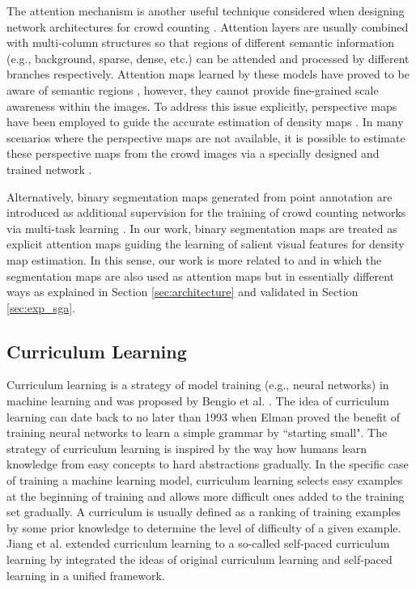 \documentclass[journal,comsoc]{IEEEtran}
\begin{document}
The attention mechanism is another useful technique considered when designing network architectures for crowd counting \cite{liu2018decidenet,sindagi2019ha,guo2019dadnet,liu2019adcrowdnet}. Attention layers are usually combined with multi-column structures so that regions of different semantic information (e.g., background, sparse, dense, etc.) can be attended and processed by different branches respectively. Attention maps learned by these models have proved to be aware of semantic regions \cite{guo2019dadnet}, however, they cannot provide fine-grained scale awareness within the images. To address this issue explicitly, perspective maps have been employed to guide the accurate estimation of density maps \cite{zhang2015cross,onoro2016towards,shi2019revisiting}. In many scenarios where the perspective maps are not available, it is possible to estimate these perspective maps from the crowd images via a specially designed and trained network \cite{yan2019perspective}.

Alternatively, binary segmentation maps generated from point annotation \cite{zhao2019leveraging} are introduced as additional supervision for the training of crowd counting networks via multi-task learning \cite{zhao2019leveraging}. In our work, binary segmentation maps are treated as explicit attention maps guiding the learning of salient visual features for density map estimation. In this sense, our work is more related to \cite{sindagi2019inverse} and \cite{shi2019counting} in which the segmentation maps are also used as attention maps but in essentially different ways as explained in Section \ref{sec:architecture} and validated in Section \ref{sec:exp_sga}.



\subsection{Curriculum Learning} \label{sec:curriculum}
Curriculum learning is a strategy of model training (e.g., neural networks) in machine learning and was proposed by Bengio et al. \cite{bengio2009curriculum}. The idea of curriculum learning can date back to no later than 1993 when Elman \cite{elman1993learning} proved the benefit of training neural networks to learn a simple grammar by ``starting small". The strategy of curriculum learning is inspired by the way how humans learn knowledge from easy concepts to hard abstractions gradually. In the specific case of training a machine learning model, curriculum learning selects easy examples at the beginning of training and allows more difficult ones added to the training set gradually. A curriculum is usually defined as a ranking of training examples by some prior knowledge to determine the level of difficulty of a given example. Jiang et al. \cite{jiang2015self} extended curriculum learning to a so-called self-paced curriculum learning by integrated the ideas of original curriculum learning and self-paced learning \cite{kumar2010self} in a unified framework. 
\end{document}
